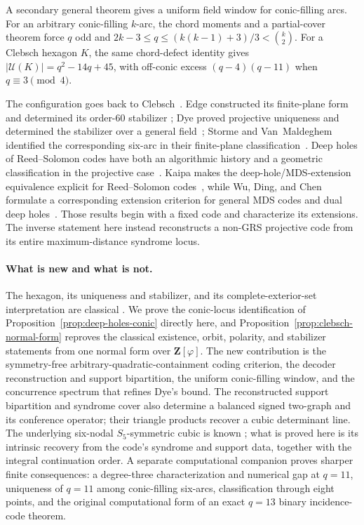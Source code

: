 \documentclass[11pt]{article}
\theoremstyle{definition}
\theoremstyle{remark}
\newcommand{\cU}{\mathcal{U}}
\begin{document}
A secondary general theorem gives a uniform field window for conic-filling arcs.
For an arbitrary conic-filling $k$-arc, the chord moments and a
partial-cover theorem force $q$ odd and
$2k-3\le q\le(k(k-1)+3)/3<\binom{k}{2}$.  For a Clebsch hexagon $K$, the
same chord-defect identity gives $|\cU(K)|=q^2-14q+45$, with off-conic
excess $(q-4)(q-11)$ when $q\equiv3\pmod4$.

The configuration goes back to Clebsch~\cite[p.~336]{Clebsch1871}. Edge
constructed its finite-plane form and determined its order-$60$ stabilizer
\cite[\S\S29--32]{Edge1956}; Dye proved projective uniqueness and determined
the stabilizer over a general field~\cite[Theorems~1 and 3,
pp.~275--278]{Dye1991}; Storme and Van~Maldeghem identified the corresponding
six-arc in their finite-plane classification~\cite{SVM1995}. Deep holes of
Reed--Solomon codes have both an algorithmic history
\cite{GuruswamiVardy2005,ChengMurray2007} and a geometric classification in
the projective case~\cite{ZWK2020}. Kaipa makes the
deep-hole/MDS-extension equivalence explicit for Reed--Solomon
codes~\cite{Kaipa2017}, while Wu, Ding, and Chen formulate a corresponding
extension criterion for general MDS codes and dual deep
holes~\cite{WuDingChen2025}. Those results begin with a fixed code and
characterize its extensions. The inverse statement here instead
reconstructs a non-GRS projective code from its entire maximum-distance
syndrome locus.

\paragraph{What is new and what is not.} The hexagon, its uniqueness and
stabilizer, and its complete-exterior-set interpretation are classical
\cite{Clebsch1871,Edge1956,Dye1991,BSW1992,SVM1995}. We prove the
conic-locus identification of Proposition~\ref{prop:deep-holes-conic}
directly here, and Proposition~\ref{prop:clebsch-normal-form} reproves the
classical existence, orbit, polarity, and stabilizer statements from one
normal form over $\mathbf Z[\varphi]$. The new contribution is the
symmetry-free arbitrary-quadratic-containment coding criterion,
the decoder reconstruction and support bipartition, the uniform
conic-filling window, and the concurrence spectrum that refines Dye's
bound.  The reconstructed support bipartition and syndrome
cover also determine a balanced signed two-graph and its conference operator;
their triangle products recover a cubic determinant line.  The underlying
six-nodal $S_5$-symmetric cubic is known
\cite{CTZ2025}; what is proved here is its intrinsic recovery from the
code's syndrome and support data, together with the integral continuation
order.  A separate computational companion
\cite{RuddComputational2026} proves sharper finite consequences: a
degree-three characterization and numerical gap at $q=11$, uniqueness of
$q=11$ among conic-filling six-arcs, classification through eight points,
and the original computational form of an exact $q=13$ binary incidence-code
theorem.
\end{document}

